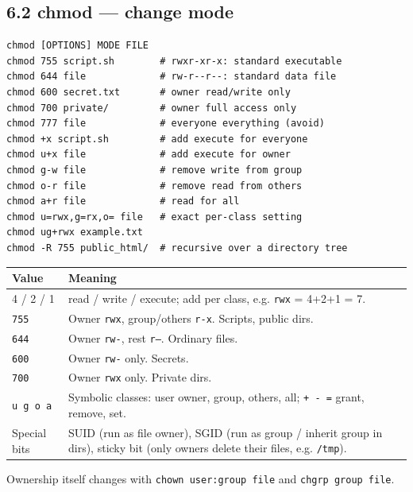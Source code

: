 \documentclass[11pt,a4paper]{article}
\newcommand{\cmd}[1]{\texttt{#1}}
\begin{document}
\subsection{6.2 chmod --- change mode}
\begin{lstlisting}
chmod [OPTIONS] MODE FILE
chmod 755 script.sh        # rwxr-xr-x: standard executable
chmod 644 file             # rw-r--r--: standard data file
chmod 600 secret.txt       # owner read/write only
chmod 700 private/         # owner full access only
chmod 777 file             # everyone everything (avoid)
chmod +x script.sh         # add execute for everyone
chmod u+x file             # add execute for owner
chmod g-w file             # remove write from group
chmod o-r file             # remove read from others
chmod a+r file             # read for all
chmod u=rwx,g=rx,o= file   # exact per-class setting
chmod ug+rwx example.txt
chmod -R 755 public_html/  # recursive over a directory tree
\end{lstlisting}
\begin{center}
\small
\begin{tabularx}{\textwidth}{lX}
\toprule
Value & Meaning \\
\midrule
4 / 2 / 1 & read / write / execute; add per class, e.g. \cmd{rwx} = 4+2+1 = 7. \\
\cmd{755} & Owner \cmd{rwx}, group/others \cmd{r-x}. Scripts, public dirs. \\
\cmd{644} & Owner \cmd{rw-}, rest \cmd{r--}. Ordinary files. \\
\cmd{600} & Owner \cmd{rw-} only. Secrets. \\
\cmd{700} & Owner \cmd{rwx} only. Private dirs. \\
\cmd{u g o a} & Symbolic classes: user owner, group, others, all; \cmd{+ - =} grant, remove, set. \\
Special bits & SUID (run as file owner), SGID (run as group / inherit group in dirs), sticky bit (only owners delete their files, e.g. \cmd{/tmp}). \\
\bottomrule
\end{tabularx}
\end{center}
Ownership itself changes with \cmd{chown user:group file} and \cmd{chgrp group file}.
\end{document}
